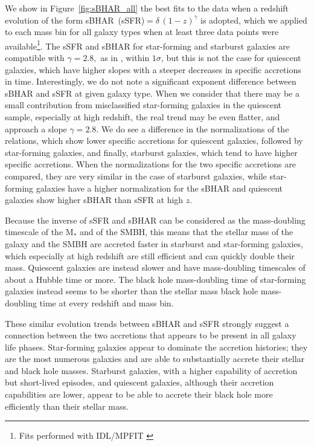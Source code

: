 We show in Figure~\ref{fig:sBHAR_all} the best fits to the data when a redshift evolution of the form
sBHAR~(sSFR)$=\delta\, (1-z)^{\gamma}$ is adopted, which we applied to each mass bin for all galaxy types when at least three data points were available\footnote{Fits performed with IDL/MPFIT \citep{2009ASPC..411..251M}}. 
The sSFR and sBHAR for star-forming and starburst galaxies are compatible with $\gamma=2.8,$ as in \citet{2012ApJ...747L..31S}, within $1\sigma$, but this is not the case for quiescent galaxies, which have higher slopes with a steeper decreases in specific accretions in time. Interestingly, we do not note a significant exponent difference between sBHAR and sSFR at given galaxy type.
When we consider that there may be a small contribution from misclassified star-forming galaxies in the quiescent sample, especially at high redshift, the real trend may be even flatter, and approach a slope $\gamma=2.8$.
We do see a difference in the normalizations of the relations, which show lower specific accretions for quiescent galaxies, followed by star-forming galaxies, and finally, starburst galaxies, which tend to have higher specific accretions.
When  the normalizations for the two specific accretions are compared, they are very similar in the case of starburst galaxies, while star-forming galaxies have a higher normalization for the sBHAR and quiescent galaxies show higher sBHAR than sSFR at high $z$.

    Because the inverse of sSFR and sBHAR can be considered as the mass-doubling timescale of the M$_*$ and of the SMBH, this means that the stellar mass of the galaxy and the SMBH are accreted faster in starburst and star-forming galaxies, which especially at high redshift are still efficient and can quickly double their mass. Quiescent galaxies are instead slower and have mass-doubling timescales of about a Hubble time or more. The black hole mass-doubling time of star-forming galaxies instead seems to be shorter than the stellar mass black hole mass-doubling time at every redshift and mass bin.
    
These similar evolution trends between sBHAR and sSFR strongly suggest a connection between the two accretions that appears to be present in all galaxy life phases. Star-forming galaxies appear to dominate the accretion histories; they are the most numerous galaxies and are able to substantially accrete their stellar and black hole masses. Starburst galaxies, with a higher capability of accretion but short-lived episodes, and quiescent galaxies, although their accretion capabilities are lower, appear to be able to accrete their black hole more efficiently than their stellar mass.
   
